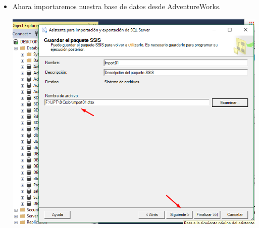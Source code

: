 \begin{itemize}
	\item  Ahora importaremos nuestra base de datos desde AdventureWorks.
	\begin{center}
	\includegraphics[width=14cm]{./Imagenes/tarea1_2}
	\end{center}


\end{itemize}
